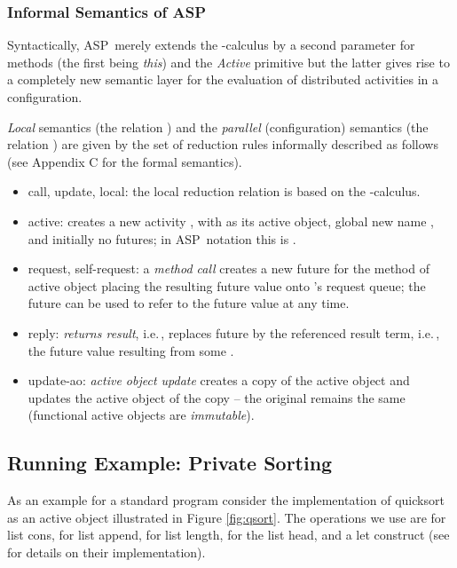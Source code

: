 \documentclass[10pt, conference, compsocconf]{IEEEtran}
\newcommand\aspfun{ASP\ }
\newcommand\aspfunp{ASP}
\newcommand\ie{i.e.\!\,, }
\begin{document}
{\subsubsection{Informal Semantics of \aspfunp}
Syntactically, \aspfun merely extends the -calculus by a second parameter for methods
(the first being {\it this})
and the \emph{Active} primitive but the latter gives rise to a completely new semantic layer for
the evaluation of distributed activities in a configuration.

{\it Local} semantics (the relation ) and the 
{\it parallel} (configuration) semantics (the relation )
are given by the set of reduction rules informally described as follows (see Appendix C for the formal semantics). \begin{itemize}
\item {\sc call, update, local}: the local reduction relation {} is based on the -calculus.
\item {\sc active}: {} creates a new activity {}, 
  with {} as its active object, global new name {}, and initially no futures; in \aspfun notation this is {}.
\item {\sc request, self-request}: a {\it method call} {} creates a new future
  {} for the method  of active object {} placing the resulting future value
  onto 's request queue; the future  can be used to refer to the future value 
   at any time.
\item {\sc reply}: {\it returns result}, \ie replaces future {} by the
      referenced result term, \ie the future value resulting from some .
\item {\sc update-ao}: {\it active object update} creates a copy of the active object
      and updates the active object of the copy -- the original remains the same (functional active objects are {\it immutable}).
\end{itemize}
\subsection{Running Example: Private Sorting} 
\label{sec:ex}
As an example for a standard program consider the implementation of 
quicksort as an active object  illustrated in Figure \ref{fig:qsort}. 
The operations we use are  for list cons,
 for list append,  for list length,  for the list head, and a let construct 
(see \cite{hkl:11} for details on their implementation). 

\noindent \begin{small}

\end{small}

}
\end{document}
